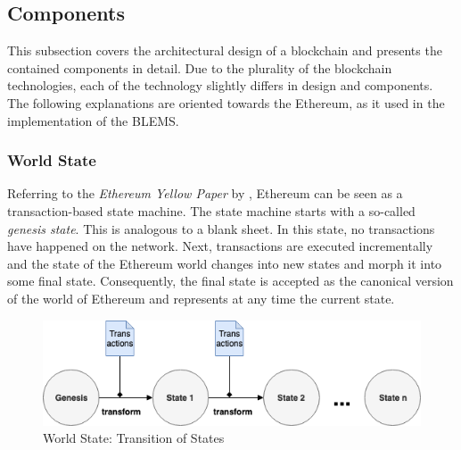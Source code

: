 \subsection{Components}
This subsection covers the architectural design of a blockchain and presents the 
contained components in detail. Due to the plurality of the blockchain technologies, 
each of the technology slightly differs in design and components. 
The following explanations are oriented towards the Ethereum, as it used 
in the implementation of the BLEMS.

\subsubsection{World State}
\label{sec:world_state}
Referring to the \textit{Ethereum Yellow Paper} by , Ethereum 
can be seen as a transaction-based state machine.
The state machine starts with a so-called 
\textit{genesis state}. This is analogous to a blank sheet. 
In this state, no transactions have happened on the network. 
Next, transactions are executed incrementally and the state of the Ethereum world 
changes into new states and morph it into some final state. 
Consequently, the final state 
is accepted as the canonical version of the world of Ethereum and 
represents at any time the current state.

\begin{figure}[htbp]
	\centering
	\includegraphics[width=.75\linewidth]{./figures/state_transition.png}
	\caption{World State: Transition of States}
	\label{figure:state_transition}
\end{figure}

